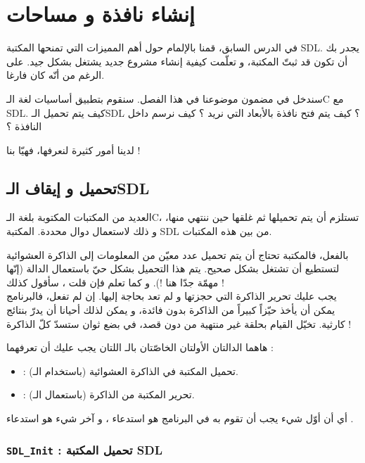 \chapter{إنشاء نافذة و مساحات}

في الدرس السابق، قمنا بالإلمام حول أهم المميزات التي تمنحها المكتبة 
\textenglish{SDL}.
يجدر بك أن تكون قد ثبتّ المكتبة، و تعلّمت كيفية إنشاء مشروع جديد يشتغل بشكل جيد.  على الرغم من أنّه كان فارغا.

سندخل في مضمون موضوعنا في هذا الفصل. سنقوم بتطبيق أساسيات لغة الـ\textenglish{C}
مع
\textenglish{SDL}.
كيف يتم تحميل الـ\textenglish{SDL} ؟
كيف يتم فتح نافذة بالأبعاد التي نريد ؟ كيف نرسم داخل النافذة ؟

لدينا أمور كثيرة لنعرفها، فهيّا بنا !

\section{تحميل و إيقاف الـ\textenglish{SDL}}

العديد من المكتبات المكتوبة بلغة الـ\textenglish{C}،
تستلزم أن يتم تحميلها ثم غلقها حين ننتهي منها، و ذلك لاستعمال دوال محددة. المكتبة
\textenglish{SDL}
من بين هذه المكتبات. 

بالفعل، فالمكتبة تحتاج أن يتم تحميل عدد معيّن من المعلومات إلى الذاكرة العشوائية لتستطيع أن تشتغل بشكل صحيح. يتم هذا التحميل بشكل حيّ باستعمال الدالة 
(إنّها مهمّة جدّا هنا !). و كما تعلم فإن قلت
،
سأقول كذلك
 !\\
يجب عليك تحرير الذاكرة التي حجزتها و لم تعد بحاجة إليها. إن لم تفعل، فالبرنامج يمكن أن يأخذ حيّزاً كبيراً من الذاكرة بدون فائدة، و يمكن لذلك أحيانا أن يدرّ بنتائج كارثية. تخيّل القيام بحلقة غير منتهية من
دون قصد، في بضع ثوان ستسدّ كلّ الذاكرة !

هاهما الدالتان الأولتان الخاصّتان بالـ
اللتان يجب عليك أن تعرفهما :
\begin{itemize}
	\item {} :
	تحميل المكتبة في الذاكرة العشوائية (باستخدام الـ).
	\item {} :
	تحرير المكتبة من الذاكرة (باستعمال الـ).
\end{itemize}

أي أن أوّل شيء يجب أن تقوم به في البرنامج هو استدعاء
،
و آخر شيء هو استدعاء
.

\subsection{\texttt{SDL\_Init} : تحميل المكتبة \textenglish{SDL}}

